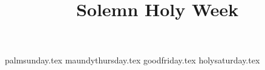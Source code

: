 \documentclass[letterpaper]{report}
\title{Solemn Holy Week}
\begin{document}
\maketitle

{palmsunday.tex}
{maundythursday.tex}
{goodfriday.tex}
{holysaturday.tex}

\printbibliography
\end{document}
